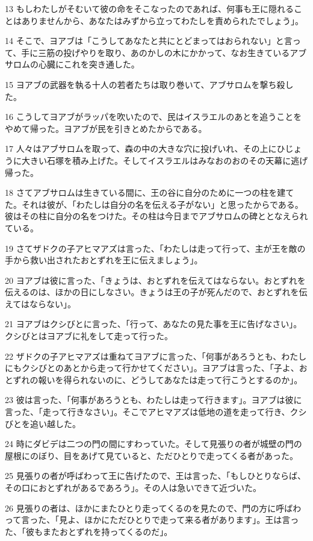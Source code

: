 \par 13 もしわたしがそむいて彼の命をそこなったのであれば、何事も王に隠れることはありませんから、あなたはみずから立ってわたしを責められたでしょう」。
\par 14 そこで、ヨアブは「こうしてあなたと共にとどまってはおられない」と言って、手に三筋の投げやりを取り、あのかしの木にかかって、なお生きているアブサロムの心臓にこれを突き通した。
\par 15 ヨアブの武器を執る十人の若者たちは取り巻いて、アブサロムを撃ち殺した。
\par 16 こうしてヨアブがラッパを吹いたので、民はイスラエルのあとを追うことをやめて帰った。ヨアブが民を引きとめたからである。
\par 17 人々はアブサロムを取って、森の中の大きな穴に投げいれ、その上にひじょうに大きい石塚を積み上げた。そしてイスラエルはみなおのおのその天幕に逃げ帰った。
\par 18 さてアブサロムは生きている間に、王の谷に自分のために一つの柱を建てた。それは彼が、「わたしは自分の名を伝える子がない」と思ったからである。彼はその柱に自分の名をつけた。その柱は今日までアブサロムの碑ととなえられている。
\par 19 さてザドクの子アヒマアズは言った、「わたしは走って行って、主が王を敵の手から救い出されたおとずれを王に伝えましょう」。
\par 20 ヨアブは彼に言った、「きょうは、おとずれを伝えてはならない。おとずれを伝えるのは、ほかの日にしなさい。きょうは王の子が死んだので、おとずれを伝えてはならない」。
\par 21 ヨアブはクシびとに言った、「行って、あなたの見た事を王に告げなさい」。クシびとはヨアブに礼をして走って行った。
\par 22 ザドクの子アヒマアズは重ねてヨアブに言った、「何事があろうとも、わたしにもクシびとのあとから走って行かせてください」。ヨアブは言った、「子よ、おとずれの報いを得られないのに、どうしてあなたは走って行こうとするのか」。
\par 23 彼は言った、「何事があろうとも、わたしは走って行きます」。ヨアブは彼に言った、「走って行きなさい」。そこでアヒマアズは低地の道を走って行き、クシびとを追い越した。
\par 24 時にダビデは二つの門の間にすわっていた。そして見張りの者が城壁の門の屋根にのぼり、目をあげて見ていると、ただひとりで走ってくる者があった。
\par 25 見張りの者が呼ばわって王に告げたので、王は言った、「もしひとりならば、その口におとずれがあるであろう」。その人は急いできて近づいた。
\par 26 見張りの者は、ほかにまたひとり走ってくるのを見たので、門の方に呼ばわって言った、「見よ、ほかにただひとりで走って来る者があります」。王は言った、「彼もまたおとずれを持ってくるのだ」。
